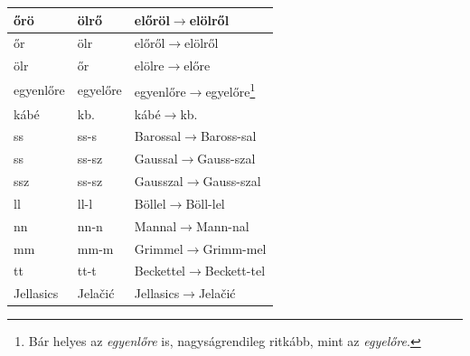 \begin{longtable}[l]{llp{10cm}}
\\ \hline  őrö & ölrő & előröl$\rightarrow$elölről
\\ \hline  őr & ölr & előről$\rightarrow$elölről
\\ \hline  ölr & őr & elölre$\rightarrow$előre
\\ \hline egyenlőre & egyelőre & egyenlőre$\rightarrow$egyelőre\footnote{Bár
helyes az \emph{egyenlőre} is, nagyságrendileg ritkább, mint az \emph{egyelőre}.}
\\ \hline kábé& kb. & kábé$\rightarrow$kb.
\\ \hline ss& ss-s & Barossal$\rightarrow$Baross-sal
\\ \hline ss& ss-sz & Gaussal$\rightarrow$Gauss-szal
\\ \hline ssz& ss-sz & Gausszal$\rightarrow$Gauss-szal
\\ \hline ll& ll-l & Böllel$\rightarrow$Böll-lel
\\ \hline nn& nn-n & Mannal$\rightarrow$Mann-nal
\\ \hline mm& mm-m & Grimmel$\rightarrow$Grimm-mel
\\ \hline tt& tt-t & Beckettel$\rightarrow$Beckett-tel
\\ \hline Jellasics& Jelačić & Jellasics$\rightarrow$Jelačić
\\ \hline
\end{longtable}
